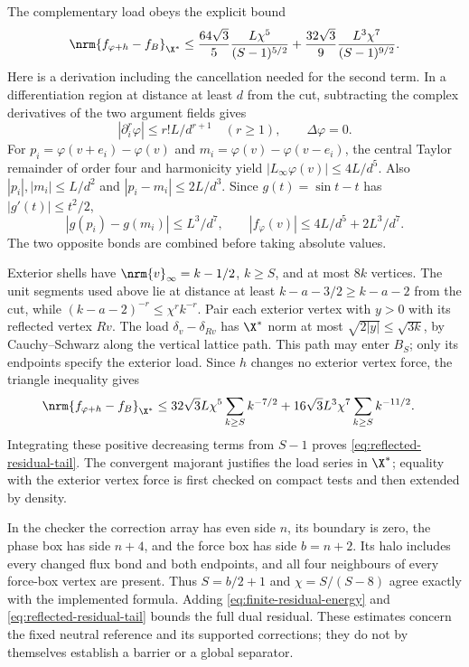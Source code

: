 The complementary load obeys the explicit bound
\begin{equation}
 \nrm{f_{\varphi+h}-f_B}_{\X^*}
 \le \frac{64\sqrt3}{5}\frac{L\chi^5}{(S-1)^{5/2}}
      +\frac{32\sqrt3}{9}\frac{L^3\chi^7}{(S-1)^{9/2}}.
 \label{eq:reflected-residual-tail}
\end{equation}
Here is a derivation including the cancellation needed for the second
term. In a differentiation region at distance at least $d$ from the cut,
subtracting the complex derivatives of the two argument fields gives
\[
 |\partial_i^r\varphi|\le r!L/d^{r+1}\quad(r\ge1),
 \qquad \Delta\varphi=0.
\]
For $p_i=\varphi(v+e_i)-\varphi(v)$ and
$m_i=\varphi(v)-\varphi(v-e_i)$, the central Taylor remainder of order
four and harmonicity yield $|L_\infty\varphi(v)|\le4L/d^5$.
Also $|p_i|,|m_i|\le L/d^2$ and $|p_i-m_i|\le2L/d^3$.
Since $g(t)=\sin t-t$ has $|g'(t)|\le t^2/2$,
\[
 |g(p_i)-g(m_i)|\le L^3/d^7,\qquad
 |f_\varphi(v)|\le4L/d^5+2L^3/d^7.
\]
The two opposite bonds are combined before taking absolute values.

Exterior shells have $\nrm{v}_\infty=k-1/2$, $k\ge S$, and at most
$8k$ vertices. The unit segments used above lie at distance at least
$k-a-3/2\ge k-a-2$ from the cut, while
$(k-a-2)^{-r}\le\chi^r k^{-r}$. Pair each exterior vertex with $y>0$
with its reflected vertex $Rv$. The load $\delta_v-\delta_{Rv}$ has
$\X^*$ norm at most $\sqrt{2|y|}\le\sqrt{3k}$, by Cauchy--Schwarz
along the vertical lattice path. This path may enter $B_S$; only its
endpoints specify the exterior load. Since $h$ changes no exterior
vertex force, the triangle inequality gives
\begin{align*}
 \nrm{f_{\varphi+h}-f_B}_{\X^*}
 &\le32\sqrt3 L\chi^5\sum_{k\ge S}k^{-7/2}
       +16\sqrt3 L^3\chi^7\sum_{k\ge S}k^{-11/2}.
\end{align*}
Integrating these positive decreasing terms from $S-1$ proves
\eqref{eq:reflected-residual-tail}. The convergent majorant justifies
the load series in $\X^*$; equality with the exterior vertex force is
first checked on compact tests and then extended by density.

In the checker the correction array has even side $n$, its boundary
is zero, the phase box has side $n+4$, and the force box has side
$b=n+2$. Its halo includes every changed flux bond and both endpoints,
and all four neighbours of every force-box vertex are present.
Thus $S=b/2+1$ and $\chi=S/(S-8)$ agree exactly with the implemented
formula. Adding \eqref{eq:finite-residual-energy} and
\eqref{eq:reflected-residual-tail} bounds the full dual residual.
These estimates concern the fixed neutral reference and its supported
corrections; they do not by themselves establish a barrier or a global
separator.
